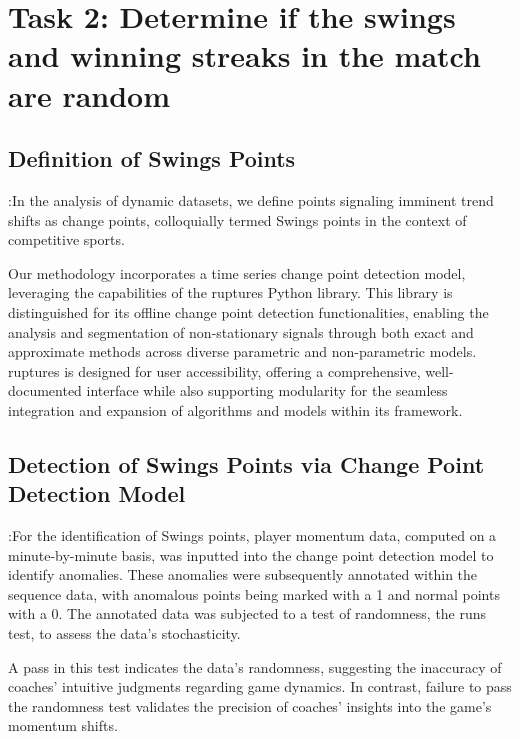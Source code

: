 \documentclass{mcmthesis}
\begin{document}
\section{Task 2: Determine if the swings and winning streaks in the match are random}
\subsection{Definition of Swings Points}:In the analysis of dynamic datasets, we define points signaling imminent trend shifts as change points, colloquially termed Swings points in the context of competitive sports.

Our methodology incorporates a time series change point detection model, leveraging the capabilities of the ruptures Python library. This library is distinguished for its offline change point detection functionalities, enabling the analysis and segmentation of non-stationary signals through both exact and approximate methods across diverse parametric and non-parametric models. ruptures is designed for user accessibility, offering a comprehensive, well-documented interface while also supporting modularity for the seamless integration and expansion of algorithms and models within its framework.
\subsection{Detection of Swings Points via Change Point Detection Model}:For the identification of Swings points, player momentum data, computed on a minute-by-minute basis, was inputted into the change point detection model to identify anomalies. These anomalies were subsequently annotated within the sequence data, with anomalous points being marked with a 1 and normal points with a 0. The annotated data was subjected to a test of randomness, the runs test, to assess the data's stochasticity.

A pass in this test indicates the data's randomness, suggesting the inaccuracy of coaches' intuitive judgments regarding game dynamics. In contrast, failure to pass the randomness test validates the precision of coaches' insights into the game's momentum shifts.
\end{document}
